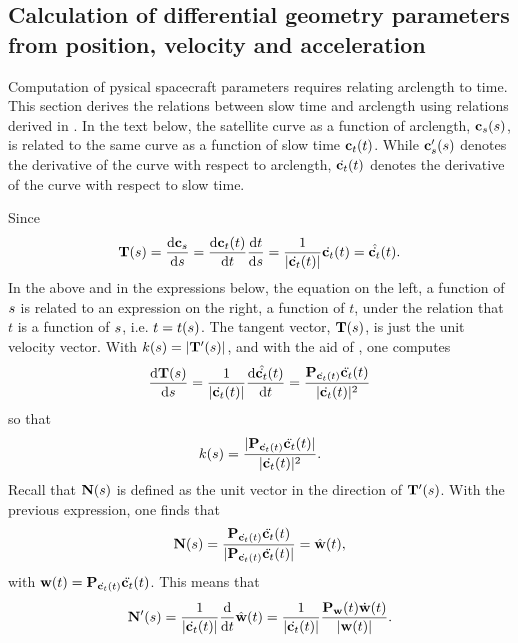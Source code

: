 \subsection{Calculation of differential geometry parameters from position, velocity and acceleration}
\label{sc:arcslow}
Computation of pysical spacecraft parameters requires relating arclength to time. This section derives the relations between slow time and arclength using relations derived in . In the text below, the satellite curve as a function of arclength, $\mathbf{c}_s(s)$, is related to the same curve as a function of slow time $\mathbf{c}_t(t)$. While $\mathbf{c}_s'(s)$ denotes the derivative of the curve with respect to arclength, $\dot{\mathbf{c}_t}(t)$ denotes the derivative of the curve with respect to slow time.
\par
Since
\begin{equation}
\mathbf{T}(s) = \frac{\text{d}{\ensuremath{\mathbf{c}_s}}}{\text{d}{\ensuremath{s}}} = \frac{\text{d}{\ensuremath{\mathbf{c}_t}(t)}}{\text{d}{t}}\frac{\text{d}{t}}{\text{d}{\ensuremath{s}}} = \frac{1}{\lvert\dot{\mathbf{c}_t}(t)\rvert}\dot{\mathbf{c}_t}(t) = \hat{\dot{\mathbf{c}_t}}(t).
\end{equation}
In the above and in the expressions below, the equation on the left, a function of $s$ is related to an expression on the right, a function of $t$, under the relation that $t$ is a function of $s$, i.e. $t = t(s)$.
The tangent vector, $\mathbf{T}(s)$, is just the unit velocity vector. With $k(s) = \lvert \mathbf{T}'(s)\rvert$, and with the aid of , one computes
\begin{equation}
 \frac{\d{\vct{T}(\parm)}}{\d{\parm}} = \frac{1}{\lvert\dx(t)\rvert}\frac{\d{\hat\dx(t)}}{\d{t}} = \frac{\mtx{P}_{\dx(t)}\ddx(t)}{\lvert\dx(t)\rvert^2}
\end{equation}
so that
\begin{equation}
 k(\parm) = \frac{\lvert\mtx{P}_{\dx(t)}\ddx(t)\rvert}{\lvert\dx(t)\rvert^2}.
\end{equation}
Recall that $\mathbf{N}(s)$ is defined as the unit vector in the direction of $\mathbf{T}'(s)$. With the previous expression, one finds that
\begin{equation}
 \vct{N}(\parm) = \frac{\mtx{P}_{\dx(t)}\ddx(t)}{\lvert\mtx{P}_{\dx(t)}\ddx(t)\rvert} = \hat{\vct{w}}(t),
\end{equation}
with $\vct{w}(t) = \mtx{P}_{\dx(t)}\ddx(t)$. This means that 
\begin{equation}
\vct{N}'(\parm) = \frac{1}{\lvert\dx(t)\rvert}\frac{\d{}}{\d{t}}\hat{\vct{w}}(t)=\frac{1}{\lvert\dx(t)\rvert}\frac{\mtx{P}_\vct{w}(t)\dot{\vct{w}}(t)}{\lvert\vct{w}(t)\rvert}.
\end{equation}
